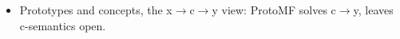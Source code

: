 \begin{itemize}
    \item [TBD] Prototypes and concepts, the x$\to$c$\to$y view: ProtoMF solves c$\to$y, leaves c-semantics open. 

\end{itemize}

